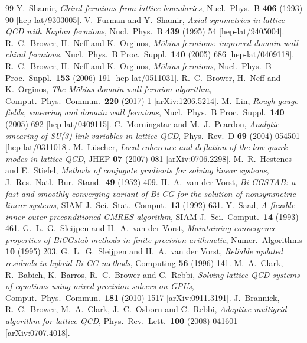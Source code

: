 \documentclass[11pt,a4paper]{article}
\newcounter{alg}
\numberwithin{equation}{section}
\begin{document}
\begin{thebibliography}{99}
 Y.~Shamir, \emph{Chiral fermions from lattice boundaries},
Nucl.\ Phys.\ B \textbf{406} (1993) 90 [hep-lat/9303005].
 V.~Furman and Y.~Shamir, \emph{Axial symmetries in lattice QCD with Kaplan fermions},
Nucl.\ Phys.\ B \textbf{439} (1995) 54 [hep-lat/9405004].
 R.~C.~Brower, H.~Neff and K.~Orginos, \emph{M\"obius fermions: improved domain wall chiral fermions},
Nucl.\ Phys.\ B Proc.\ Suppl.\ \textbf{140} (2005) 686 [hep-lat/0409118].
 R.~C.~Brower, H.~Neff and K.~Orginos, \emph{M\"obius fermions},
Nucl.\ Phys.\ B Proc.\ Suppl.\ \textbf{153} (2006) 191 [hep-lat/0511031].
 R.~C.~Brower, H.~Neff and K.~Orginos, \emph{The M\"obius domain wall fermion algorithm},
Comput.\ Phys.\ Commun.\ \textbf{220} (2017) 1 [arXiv:1206.5214].
 M.~Lin, \emph{Rough gauge fields, smearing and domain wall fermions},
Nucl.\ Phys.\ B Proc.\ Suppl.\ \textbf{140} (2005) 692 [hep-lat/0409115].
 C.~Morningstar and M.~J.~Peardon, \emph{Analytic smearing of SU(3) link variables in lattice QCD},
Phys.\ Rev.\ D \textbf{69} (2004) 054501 [hep-lat/0311018].
 M.~L\"uscher, \emph{Local coherence and deflation of the low quark modes in lattice QCD},
JHEP \textbf{07} (2007) 081 [arXiv:0706.2298].
 M.~R.~Hestenes and E.~Stiefel, \emph{Methods of conjugate gradients for solving linear systems}, J.\ Res.\ Natl.\ Bur.\ Stand.\ \textbf{49} (1952) 409.
 H.~A.~van der Vorst, \emph{Bi-CGSTAB: a fast and smoothly converging variant of Bi-CG for the solution of nonsymmetric linear systems}, SIAM J.\ Sci.\ Stat.\ Comput.\ \textbf{13} (1992) 631.
 Y.~Saad, \emph{A flexible inner-outer preconditioned GMRES algorithm}, SIAM J.\ Sci.\ Comput.\ \textbf{14} (1993) 461.
 G.~L.~G.~Sleijpen and H.~A.~van der Vorst, \emph{Maintaining convergence properties of BiCGstab methods in finite precision arithmetic}, Numer.\ Algorithms \textbf{10} (1995) 203.
 G.~L.~G.~Sleijpen and H.~A.~van der Vorst, \emph{Reliable updated residuals in hybrid Bi-CG methods}, Computing \textbf{56} (1996) 141.
 M.~A.~Clark, R.~Babich, K.~Barros, R.~C.~Brower and C.~Rebbi, \emph{Solving lattice QCD systems of equations using mixed precision solvers on GPUs}, Comput.\ Phys.\ Commun.\ \textbf{181} (2010) 1517 [arXiv:0911.3191].
 J.~Brannick, R.~C.~Brower, M.~A.~Clark, J.~C.~Osborn and C.~Rebbi, \emph{Adaptive multigrid algorithm for lattice QCD},
Phys.\ Rev.\ Lett.\ \textbf{100} (2008) 041601 [arXiv:0707.4018].

\end{thebibliography}
\end{document}
